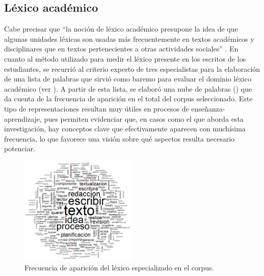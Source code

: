 \documentclass{textolivre-html}
\begin{document}
\subsection{Léxico académico}\label{sec-lex}
Cabe precisar que “la noción de léxico académico presupone la idea de
que algunas unidades léxicas son usadas más frecuentemente en textos académicos
y disciplinares que en textos pertenecientes a otras actividades sociales”
\cite[p. 251]{CisnerosEstupian2019}. En cuanto al método utilizado para medir el
léxico presente en los escritos de los estudiantes, se recurrió al criterio
experto de tres especialistas para la elaboración de una lista de palabras que
sirvió como baremo para evaluar el dominio léxico académico (ver ). A partir
de esta lista, se elaboró una nube de palabras () que da cuenta de la
frecuencia de aparición en el total del corpus seleccionado. Este tipo de
representaciones resultan muy útiles en procesos de enseñanza-aprendizaje,
pues permiten evidenciar que, en casos como el que aborda esta investigación,
hay conceptos clave que efectivamente aparecen con muchísima frecuencia, lo que
favorece una visión sobre qué aspectos resulta necesario potenciar.

\begin{figure}[htbp]
 \centering
 \includegraphics[width=0.5\textwidth]{figure01.pdf}
 \caption{Frecuencia de aparición del léxico especializado en el corpus.}
 \label{fig01}
\end{figure}
\end{document}
